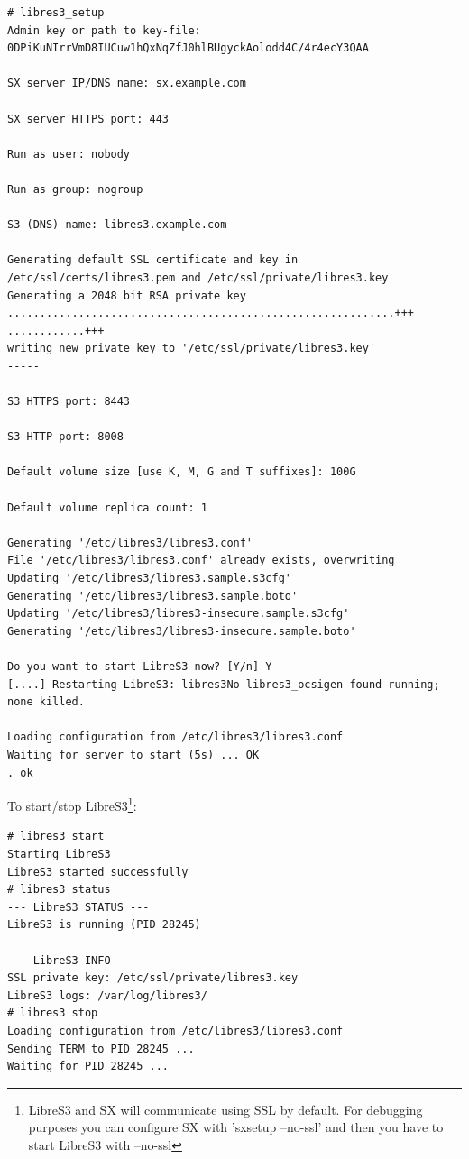 \begin{lstlisting}
# libres3_setup
Admin key or path to key-file: 0DPiKuNIrrVmD8IUCuw1hQxNqZfJ0hlBUgyckAolodd4C/4r4ecY3QAA

SX server IP/DNS name: sx.example.com

SX server HTTPS port: 443

Run as user: nobody

Run as group: nogroup

S3 (DNS) name: libres3.example.com

Generating default SSL certificate and key in /etc/ssl/certs/libres3.pem and /etc/ssl/private/libres3.key
Generating a 2048 bit RSA private key
............................................................+++
............+++
writing new private key to '/etc/ssl/private/libres3.key'
-----

S3 HTTPS port: 8443

S3 HTTP port: 8008

Default volume size [use K, M, G and T suffixes]: 100G

Default volume replica count: 1

Generating '/etc/libres3/libres3.conf'
File '/etc/libres3/libres3.conf' already exists, overwriting
Updating '/etc/libres3/libres3.sample.s3cfg'
Generating '/etc/libres3/libres3.sample.boto'
Updating '/etc/libres3/libres3-insecure.sample.s3cfg'
Generating '/etc/libres3/libres3-insecure.sample.boto'

Do you want to start LibreS3 now? [Y/n] Y
[....] Restarting LibreS3: libres3No libres3_ocsigen found running; none killed.

Loading configuration from /etc/libres3/libres3.conf
Waiting for server to start (5s) ... OK
. ok 
\end{lstlisting}


To start/stop LibreS3\footnote{LibreS3 and SX will communicate using SSL by
default. For debugging purposes you can configure SX with 'sxsetup --no-ssl' and then you have to start LibreS3 with --no-ssl}:


\begin{lstlisting}
# libres3 start
Starting LibreS3
LibreS3 started successfully
# libres3 status
--- LibreS3 STATUS ---
LibreS3 is running (PID 28245)

--- LibreS3 INFO ---
SSL private key: /etc/ssl/private/libres3.key
LibreS3 logs: /var/log/libres3/
# libres3 stop
Loading configuration from /etc/libres3/libres3.conf
Sending TERM to PID 28245 ... 
Waiting for PID 28245 ...
\end{lstlisting}



